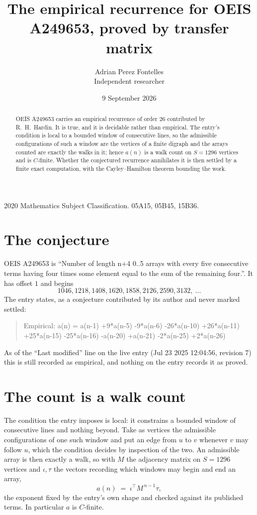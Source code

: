 \documentclass[11pt,a4paper]{article}
\title{The empirical recurrence for OEIS A249653, proved by transfer matrix}
\author{Adrian Perez Fontelles\\ \small Independent researcher}
\date{9 September 2026}
\theoremstyle{plain}
\theoremstyle{definition}
\begin{document}
\maketitle

\begin{abstract}
OEIS A249653 carries an empirical recurrence of order $26$ contributed by R.~H.~Hardin. It is
true, and it is decidable rather than empirical. The entry's condition is local to a bounded window of consecutive lines, so
the admissible configurations of such a window are the vertices of a finite digraph and the
arrays counted are exactly the walks in it; hence $a(n)$ is a walk count on $S=1296$ vertices
and is $C$-finite. Whether the conjectured recurrence annihilates it is then settled by a
finite exact computation, with the Cayley--Hamilton theorem bounding the work.
\end{abstract}

\noindent\small 2020 Mathematics Subject Classification. 05A15, 05B45, 15B36.\normalsize

\section{The conjecture}

OEIS A249653 is ``Number of length n+4 0..5 arrays with every five consecutive terms having four times some element equal to the sum of the remaining four.''. It has offset $1$ and begins
\[
1046, 1218, 1408, 1620, 1858, 2126, 2590, 3132,\ \dots
\]
The entry states, as a conjecture contributed by its author and never marked settled:
\begin{quote}
Empirical: a(n) = a(n-1) +9*a(n-5) -9*a(n-6) -26*a(n-10) +26*a(n-11) +25*a(n-15) -25*a(n-16) -a(n-20) +a(n-21) -2*a(n-25) +2*a(n-26)
\end{quote}
As of the ``Last modified'' line on the live entry (Jul 23 2025 12:04:56, revision 7) this is still
recorded as empirical, and nothing on the entry records it as proved.

\section{The count is a walk count}

The condition the entry imposes is local: it constrains a bounded window of consecutive lines and nothing beyond. Take as
vertices the admissible configurations of one such window and put an edge from $u$ to $v$
whenever $v$ may follow $u$, which the condition decides by inspection of the two. An
admissible array is then exactly a walk, so with $M$ the adjacency matrix on $S=1296$ vertices
and $\iota,\tau$ the vectors recording which windows may begin and end an array,
\[
a(n)\;=\;\iota^{\!\top}M^{\,n-1}\tau ,
\]
the exponent fixed by the entry's own shape and checked against its published terms. In
particular $a$ is $C$-finite.
\end{document}
